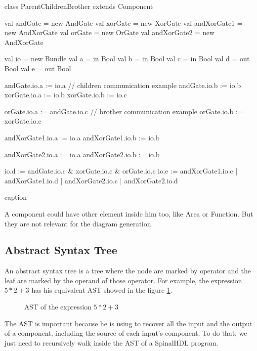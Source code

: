 \begin{listing} %
    \centering
    \begin{scalacode}
    class ParentChildrenBrother extends Component
    {
        val andGate = new AndGate
        val xorGate = new XorGate
        val andXorGate1 = new AndXorGate
        val orGate = new OrGate
        val andXorGate2 = new AndXorGate

        val io = new Bundle
        {
            val a = in Bool
            val b = in Bool
            val c = in Bool
            val d = out Bool
            val e = out Bool
        }

        andGate.io.a := io.a            // children communication example
        andGate.io.b := io.b
        xorGate.io.a := io.b
        xorGate.io.b := io.c

        orGate.io.a := andGate.io.c     // brother communication example
        orGate.io.b := xorGate.io.c     

        andXorGate1.io.a := io.a
        andXorGate1.io.b := io.b

        andXorGate2.io.a := io.a
        andXorGate2.io.b := io.b

        io.d := andGate.io.c & xorGate.io.c & orGate.io.c
        io.e := andXorGate1.io.c | andXorGate1.io.d | andXorGate2.io.c | andXorGate2.io.d
    }
    \end{scalacode}
    \caption{caption}
    \label{lst:HierarchicComponent-solo}
\end{listing} %

A component could have other element inside him too, like Area or Function. But they are not relevant for the diagram generation.


\subsection{Abstract Syntax Tree} %
\label{sub:Abstract Syntax Tree}

An abstract syntax tree is a tree where the node are marked by operator and the leaf are marked by the operand of those operator. For example, the expression $5 * 2 + 3$ has his equivalent AST showed in the figure \ref{fig:ast-example}.

\begin{figure}[h] %
    \centering
    \caption{AST of the expression $5 * 2 + 3$}
    \label{fig:ast-example}
\end{figure} %

The AST is important because he is using to recover all the input and the output of a component, including the source of each input's component. To do that, we just need to recursively walk inside the AST of a SpinalHDL program.



